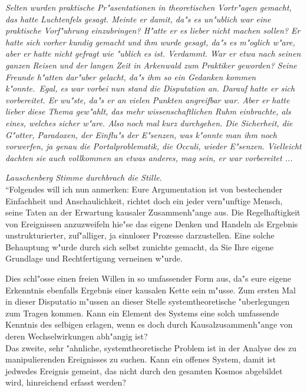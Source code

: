 \documentclass[a5paper,8pt]{book}
\begin{document}
\textit{Selten wurden praktische Pr"asentationen in theoretischen Vortr"agen gemacht, das hatte Luchtenfels gesagt. Meinte er damit, da"s es un"ublich war eine praktische 
Vorf"uhrung einzubringen? H"atte er es lieber nicht machen sollen? Er hatte sich vorher kundig gemacht und ihm wurde gesagt, da"s es m"oglich w"are, aber er hatte nicht 
gefragt wie "ublich es ist. Verdammt. War er etwa nach seinen ganzen Reisen und der langen Zeit in Arkenwald zum Praktiker geworden? Seine Freunde h"atten dar"uber gelacht, 
da"s ihm so ein Gedanken kommen k"onnte.\
Egal, es war vorbei nun stand die Disputation an. Darauf hatte er sich vorbereitet. Er wu"ste, da"s er an vielen Punkten angreifbar war. Aber er hatte lieber diese Thema 
gew"ahlt, das mehr wissenschaftlichen Ruhm einbrachte, als eines, welches sicher w"are.
Also noch mal kurz durchgehen. Die Sicherheit, die G"otter, Paradoxen, der Einflu"s der E"senzen, was k"onnte man ihm noch vorwerfen, ja genau die Portalproblematik, 
die Occuli, wieder E"senzen. Vielleicht dachten sie auch vollkommen an etwas anderes, mag sein, er war vorbereitet ... }

\textit{Lauschenberg Stimme durchbrach die Stille.}\\

``Folgendes will ich nun anmerken:
Eure Argumentation ist von bestechender Einfachheit und Anschaulichkeit, richtet doch ein jeder vern"unftige Mensch, seine Taten an der Erwartung kausaler Zusammenh"ange aus. 
Die Regelhaftigkeit von Ereignissen anzuzweifeln hie"se das eigene Denken und Handeln als Ergebnis unstrukturierter, zuf"alliger, ja sinnloser Prozesse darzustellen. Eine 
solche Behauptung w"urde durch sich selbst zunichte gemacht, da Sie Ihre eigene Grundlage und Rechtfertigung verneinen w"urde.

Dies schl"osse einen freien Willen in so umfassender Form aus, da"s eure eigene Erkenntnis ebenfalls Ergebnis einer kausalen Kette sein m"usse. 
Zum ersten Mal in dieser Disputatio m"ussen an dieser Stelle systemtheoretische "uberlegungen zum Tragen kommen. 
Kann ein Element des Systems eine solch umfassende Kenntnis des selbigen erlagen, wenn es doch durch Kausalzusammenh"ange von deren Wechselwirkungen abh"angig ist?\\

Das zweite, sehr "ahnliche, systemtheoretische Problem ist in der Analyse des zu manipulierenden Ereignisses zu suchen. Kann ein offenes System, damit ist jedwedes Ereignis 
gemeint, das nicht durch den gesamten Kosmos abgebildet wird, hinreichend erfasst werden?\\
\end{document}
